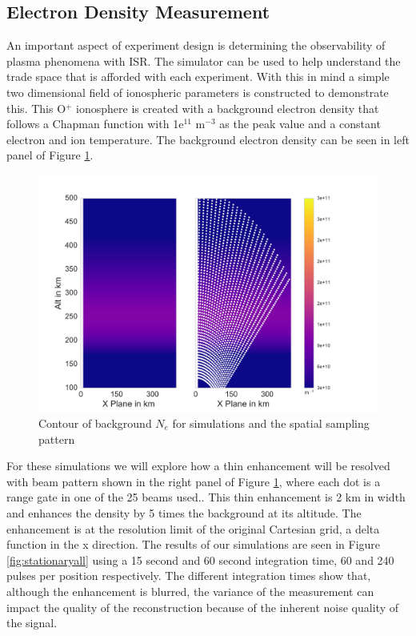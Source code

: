 \documentclass[draft,ras]{agutex}
\begin{document}
\begin{article}
\subsection{Electron Density Measurement}
An important aspect of experiment design is determining the observability of plasma phenomena with ISR. The simulator can be used to help understand the trade space that is afforded with each experiment. With this in mind a simple two dimensional field of ionospheric parameters is constructed to demonstrate this. This O$^+$ ionosphere is created with a background electron density that follows a Chapman function with 1e$^{11}$ m$^{-3}$ as the peak value and a constant electron and ion temperature. The background electron density can be seen in left panel of  Figure \ref{fig:background1}.

\begin{figure}[!t]
\centering
\includegraphics[width=5in]{backgroundandsamp}
\caption{Contour of background $N_e$ for simulations and the spatial sampling pattern}
\label{fig:background1}
\end{figure}

For these simulations we will explore how a thin enhancement will be resolved with beam pattern shown in the right panel of Figure \ref{fig:background1}, where each dot is a range gate in one of the 25 beams used.. This thin enhancement is 2 km in width and enhances the density by 5 times the background at its altitude. The enhancement is at the resolution limit of the original Cartesian grid, a delta function in the x direction. The results of our simulations are seen in Figure \ref{fig:stationaryall} using a 15 second and 60 second integration time, 60 and 240 pulses per position respectively. The different integration times show that, although the enhancement is blurred, the variance of the measurement can impact the quality of the reconstruction because of the inherent noise quality of the signal.


\end{article}
\end{document}
